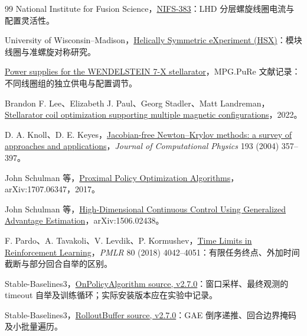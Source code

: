 \documentclass[12pt,fontset=none]{ctexart}
\numberwithin{equation}{section}
\numberwithin{table}{section}
\numberwithin{figure}{section}
\begin{document}
\begin{thebibliography}{99}
National Institute for Fusion Science，\href{https://www.nifs.ac.jp/report/nifs383.html}{NIFS-383}：LHD 分层螺旋线圈电流与配置灵活性。

University of Wisconsin--Madison，\href{https://www.hsx.wisc.edu/}{Helically Symmetric eXperiment (HSX)}：模块线圈与准螺旋对称研究。

\href{https://pure.mpg.de/pubman/item/item_2137690}{Power supplies for the WENDELSTEIN 7-X stellarator}，MPG.PuRe 文献记录：不同线圈组的独立供电与配置调节。

Brandon F. Lee、Elizabeth J. Paul、Georg Stadler、Matt Landreman，\href{https://arxiv.org/abs/2208.01096}{Stellarator coil optimization supporting multiple magnetic configurations}，2022。

D. A. Knoll、D. E. Keyes，\href{https://doi.org/10.1016/j.jcp.2003.08.010}{Jacobian-free Newton--Krylov methods: a survey of approaches and applications}，\textit{Journal of Computational Physics} 193 (2004) 357--397。

John Schulman 等，\href{https://arxiv.org/abs/1707.06347}{Proximal Policy Optimization Algorithms}，arXiv:1707.06347，2017。

John Schulman 等，\href{https://arxiv.org/abs/1506.02438}{High-Dimensional Continuous Control Using Generalized Advantage Estimation}，arXiv:1506.02438。

F. Pardo、A. Tavakoli、V. Levdik、P. Kormushev，\href{https://arxiv.org/abs/1712.00378}{Time Limits in Reinforcement Learning}，\textit{PMLR} 80 (2018) 4042--4051：有限任务终点、外加时间截断与部分回合自举的区别。

Stable-Baselines3，\href{https://stable-baselines3.readthedocs.io/en/v2.7.0/_modules/stable_baselines3/common/on_policy_algorithm.html}{OnPolicyAlgorithm source, v2.7.0}：窗口采样、最终观测的 timeout 自举及训练循环；实际安装版本应在实验中记录。

Stable-Baselines3，\href{https://github.com/DLR-RM/stable-baselines3/blob/v2.7.0/stable_baselines3/common/buffers.py}{RolloutBuffer source, v2.7.0}：GAE 倒序递推、回合边界掩码及小批量遍历。

\end{thebibliography}
\end{document}
